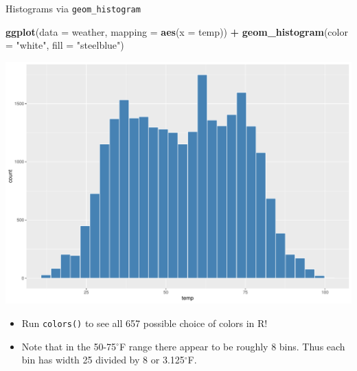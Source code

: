 \documentclass[
  ignorenonframetext,
]{beamer}
\newenvironment{Shaded}{\begin{snugshade}}{\end{snugshade}}
\newcommand{\AttributeTok}[1]{\textcolor[rgb]{0.13,0.29,0.53}{#1}}
\newcommand{\FunctionTok}[1]{\textcolor[rgb]{0.13,0.29,0.53}{\textbf{#1}}}
\newcommand{\NormalTok}[1]{#1}
\newcommand{\SpecialCharTok}[1]{\textcolor[rgb]{0.81,0.36,0.00}{\textbf{#1}}}
\newcommand{\StringTok}[1]{\textcolor[rgb]{0.31,0.60,0.02}{#1}}
\providecommand{\tightlist}{%
  \setlength{\itemsep}{0pt}\setlength{\parskip}{0pt}}
\begin{document}
\begin{frame}[fragile]{Histograms via \texttt{geom\_histogram}}
\protect\hypertarget{histograms-via-geom_histogram-3}{}
\tiny

\begin{Shaded}
\begin{Highlighting}[]
\FunctionTok{ggplot}\NormalTok{(}\AttributeTok{data =}\NormalTok{ weather, }\AttributeTok{mapping =} \FunctionTok{aes}\NormalTok{(}\AttributeTok{x =}\NormalTok{ temp)) }\SpecialCharTok{+}
  \FunctionTok{geom\_histogram}\NormalTok{(}\AttributeTok{color =} \StringTok{"white"}\NormalTok{, }\AttributeTok{fill =} \StringTok{"steelblue"}\NormalTok{)}
\end{Highlighting}
\end{Shaded}

\begin{center}\includegraphics[width=0.7\linewidth,height=0.5\textheight]{Week2_Lect_files/figure-beamer/unnamed-chunk-28-1} \end{center}
\normalsize

\begin{itemize}
\tightlist
\item
  Run \texttt{colors()} to see all 657 possible choice of colors in R!
\item
  Note that in the 50-75\(^{\circ}\)F range there appear to be roughly 8
  bins. Thus each bin has width 25 divided by 8 or 3.125\(^{\circ}\)F.
\end{itemize}
\end{frame}
\end{document}
